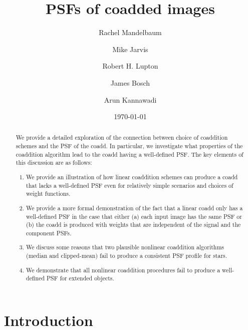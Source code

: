 \documentclass[modern]{style_and_logos/lsstdescnote}
\begin{document}
\title{PSFs of coadded images}
\author[0000-0003-2271-1527]{Rachel Mandelbaum}
\author[0000-0002-4179-5175]{Mike Jarvis}
\author[0000-0003-1666-0962]{Robert H. Lupton}
\author[0000-0003-2759-5764]{James Bosch}
\author[0000-0001-8783-6529]{Arun Kannawadi}

\date{\today}

\begin{abstract}
    We provide a detailed exploration of the connection between choice of coaddition schemes and the PSF of the coadd.  In particular, we investigate what properties of the coaddition algorithm lead to the coadd having a well-defined PSF.  The key elements of this discussion are as follows: 
    \begin{enumerate}
        \item We provide an illustration of how linear coaddition schemes can produce a coadd that lacks a well-defined PSF even for relatively simple scenarios and choices of weight functions.  
        \item We provide a more formal demonstration of the fact that a linear coadd only has a well-defined PSF in the case that either (a) each input image has the same PSF or (b) the coadd is produced with weights that are independent of the signal and the component PSFs.
        \item We discuss some reasons that two plausible nonlinear coaddition algorithms (median and clipped-mean) fail to produce a consistent PSF profile for stars.
        \item We demonstrate that all nonlinear coaddition procedures fail to produce a well-defined PSF for extended objects.
    \end{enumerate}
\end{abstract}
\maketitle

\section{Introduction}\label{sec:intro}
\end{document}
